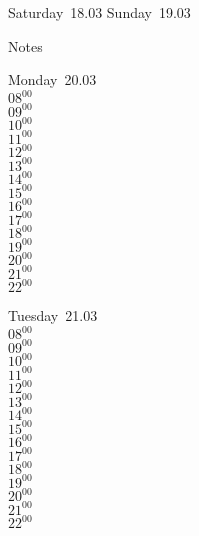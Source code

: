 \documentclass[11pt,a4paper]{book}\usepackage[]{graphicx}\usepackage[]{color}
\begin{document}
\begin{weekendbox}
  Saturday~18.03
  \tcblower
  Sunday~19.03
\end{weekendbox} %
\begin{notebox}
  Notes
\end{notebox}
\clearpage
\begin{headerbox}
\end{headerbox}
\begin{weekdaybox}
  Monday~20.03\\
  { 
  \vfill
  $08^{00}$\\
$09^{00}$\\
$10^{00}$\\
$11^{00}$\\
$12^{00}$\\
$13^{00}$\\
$14^{00}$\\
$15^{00}$\\
$16^{00}$\\
$17^{00}$\\
$18^{00}$\\
$19^{00}$\\
$20^{00}$\\
$21^{00}$\\
$22^{00}$\\
  }
\end{weekdaybox}
\begin{weekdaybox}
  Tuesday~21.03\\
  { 
  \vfill
  $08^{00}$\\
$09^{00}$\\
$10^{00}$\\
$11^{00}$\\
$12^{00}$\\
$13^{00}$\\
$14^{00}$\\
$15^{00}$\\
$16^{00}$\\
$17^{00}$\\
$18^{00}$\\
$19^{00}$\\
$20^{00}$\\
$21^{00}$\\
$22^{00}$\\
  }
\end{weekdaybox}
\end{document}
